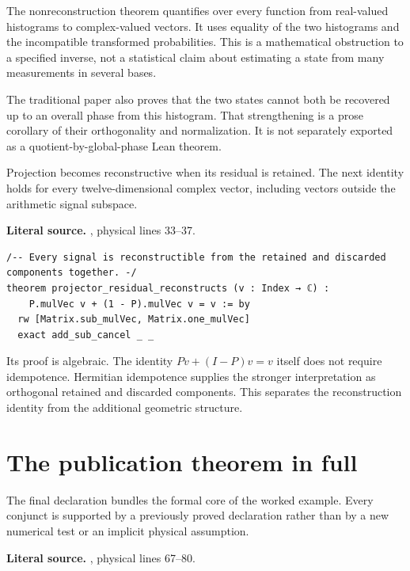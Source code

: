 The nonreconstruction theorem quantifies over every function from real-valued
histograms to complex-valued vectors. It uses equality of the two histograms and
the incompatible transformed probabilities. This is a mathematical obstruction
to a specified inverse, not a statistical claim about estimating a state from
many measurements in several bases.

The traditional paper also proves that the two states cannot both be recovered
up to an overall phase from this histogram. That strengthening is a prose
corollary of their orthogonality and normalization. It is not separately exported
as a quotient-by-global-phase Lean theorem.

Projection becomes reconstructive when its residual is retained. The next
identity holds for every twelve-dimensional complex vector, including vectors
outside the arithmetic signal subspace.

\noindent\textbf{Literal source.} \texttt{}, physical lines 33--37.

\begin{Verbatim}[breaklines=true,breakanywhere=true,fontsize=\footnotesize,samepage=true]
/-- Every signal is reconstructible from the retained and discarded components together. -/
theorem projector_residual_reconstructs (v : Index → ℂ) :
    P.mulVec v + (1 - P).mulVec v = v := by
  rw [Matrix.sub_mulVec, Matrix.one_mulVec]
  exact add_sub_cancel _ _
\end{Verbatim}

Its proof is algebraic. The identity \(Pv+(I-P)v=v\) itself does not require
idempotence. Hermitian idempotence supplies the stronger interpretation as
orthogonal retained and discarded components. This separates the reconstruction
identity from the additional geometric structure.

\section{The publication theorem in full}
The final declaration bundles the formal core of the worked example. Every
conjunct is supported by a previously proved declaration rather than by a new
numerical test or an implicit physical assumption.

\noindent\textbf{Literal source.} \texttt{}, physical lines 67--80.


